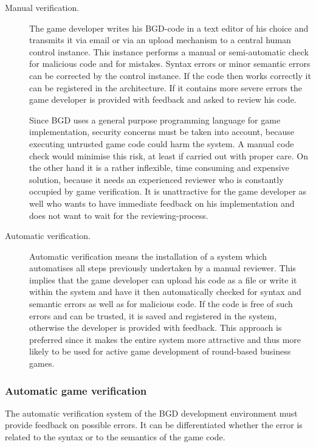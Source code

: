 \begin{description}
\item[Manual verification.] The game developer writes his BGD-code in a text editor of his choice and transmits it via email or via an upload mechanism to a central human control instance. This instance performs a manual or semi-automatic check for malicious code and for mistakes. Syntax errors or minor semantic errors can be corrected by the control instance. If the code then works correctly it can be registered in the architecture. If it contains more severe errors the game developer is provided with feedback and asked to review his code.

Since BGD uses a general purpose programming language for game implementation, security concerns must be taken into account, because executing untrusted game code could harm the system. A manual code check would minimise this risk, at least if carried out with proper care. On the other hand it is a rather inflexible, time consuming and expensive solution, because it needs an experienced reviewer who is constantly occupied by game verification. It is unattractive for the game developer as well who wants to have immediate feedback on his implementation and does not want to wait for the reviewing-process.

\item[Automatic verification.] Automatic verification means the installation of a system which automatises all steps previously undertaken by a manual reviewer. This implies that the game developer can upload his code as a file or write it within the system and have it then automatically checked for syntax and semantic errors as well as for malicious code. If the code is free of such errors and can be trusted, it is saved and registered in the system, otherwise the developer is provided with feedback. This approach is preferred since it makes the entire system more attractive and thus more likely to be used for active game development of round-based business games.
\end{description}

\subsubsection{Automatic game verification}
\label{subsub:verification}

The automatic verification system of the BGD development environment must provide feedback on possible errors. It can be differentiated whether the error is related to the syntax or to the semantics of the game code.

